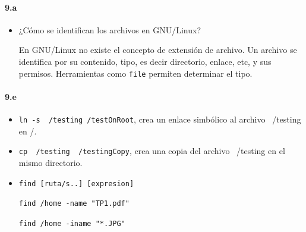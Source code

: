 \documentclass[10pt,a4paper]{paper}
\begin{document}
	
	
	
	\paragraph{9.a}
	\begin{itemize}
		\item ¿Cómo se identifican los archivos en GNU/Linux?
		
		En GNU/Linux no existe el concepto de extensión de archivo. Un archivo se
		identifica por su contenido, tipo, es decir directorio, enlace, etc, y sus
		permisos. Herramientas como \texttt{file} permiten determinar el tipo.
		
	\end{itemize}
	
	
	
	
	\paragraph{9.e}
	\begin{itemize}
		\item \texttt{ln -s ~/testing /testOnRoot}, crea un enlace simbólico al archivo
		~/testing en /.
		
		
		\item \texttt{cp ~/testing ~/testingCopy}, crea una copia del archivo ~/testing
		en el mismo directorio.
		
		\item \texttt{find [ruta/s..] [expresion]}
		
		\texttt{find /home -name "TP1.pdf"}
		
		\texttt{find /home -iname "*.JPG"}
		
	\end{itemize}
	
	
	
	
	
	
\end{document}
